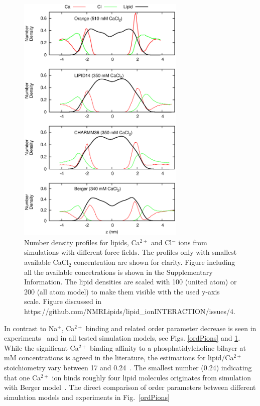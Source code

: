 \documentclass[pre,aps,floatfix,authordate1-4,twocolumn]{revtex4-1}
\begin{document}
\begin{figure}[]
  \centering
  \includegraphics[width=8cm]{../Fig/CAdensitiesCLEAR.eps}
  \caption{\label{CAdensitiesCLEAR}
    Number density profiles for lipids, Ca$^{2+}$ and Cl$^-$ ions from simulations with different force fields.
    The profiles only with smallest available CaCl$_2$ concentration are shown for clarity.
    Figure including all the available concetrations is shown in the Supplementary Information.
    The lipid densities are scaled with 100 (united atom) or 200 (all atom model) to make them visible with the used y-axis scale.
    Figure discussed in https://github.com/NMRLipids/lipid\_ionINTERACTION/issues/4.
  }
\end{figure}
In contrast to Na$^+$, Ca$^{2+}$ binding and related order parameter decrease is seen in experiments~\cite{akutsu81,altenbach84,cevc90,tocanne90} 
and in all tested simulation models, see Figs. \ref{ordPions} and \ref{CAdensitiesCLEAR}.
While the significant Ca$^{2+}$ binding affinity to a phosphatidylcholine bilayer at mM concentrations  
is agreed in the literature, the estimations for lipid/Ca$^{2+}$ stoichiometry vary between 17 
and 0.24~\cite{tatulian87,altenbach84,bockmann04}. The smallest number (0.24) indicating that one 
Ca$^{2+}$ ion binds roughly four lipid molecules originates from simulation with Berger model~\cite{bockmann04}.
The direct comparison of order parameters between different simulation models and experiments in Fig.~\ref{ordPions}
\end{document}
